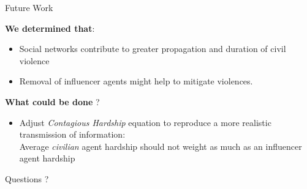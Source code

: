 \documentclass[10pt]{beamer}
\begin{document}
    \begin{frame}{Future Work}

        \textbf{We determined that}:
        \begin{itemize}
            \item Social networks contribute to greater propagation and duration of civil violence
            \item Removal of influencer agents might help to mitigate violences.
        \end{itemize}

        \hfill{}

        \textbf{What could be done} ?
        \begin{itemize}
            \item Adjust \emph{Contagious Hardship} equation to reproduce a more realistic transmission of information: \\ Average \emph{civilian} agent hardship should not weight as much as an {influencer} agent hardship
        \end{itemize}

    \end{frame}

    \begin{frame}


        \Huge Questions ?

    \end{frame}
\end{document}
